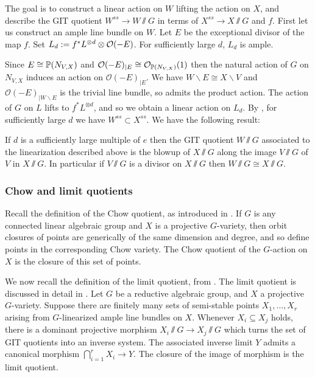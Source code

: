 The goal is to construct a linear action on \(W\) lifting the action on \(X\), and describe the GIT quotient \(W^{ss} \to W \sslash G\) in terms of \(X^{ss} \to  X \sslash G\) and \(f\). First let us construct an ample line bundle on \(W\). Let \(E\) be the exceptional divisor of the map \(f\). Set \(L_d := f^* L^{\otimes d} \otimes \mathcal{O}(-E)\). For sufficiently large \(d\), \(L_d\) is ample.

Since \(E \cong \mathbb{P}(N_{V,X})\) and \(\mathcal{O}(-E)_{|E} \cong \mathcal{O}_{\mathbb{P}(N_{V,X})}(1)\) then the natural action of \(G\) on \(N_{V,X}\) induces an action on \(\mathcal{O}(-E)_{|E}\). We have \(W \backslash E \cong X \backslash V\) and \(\mathcal{O}(-E)_{|W \backslash E}\) is the trivial line bundle, so admits the product action. The action of \(G\) on \(L\) lifts to \(f^* L^{\otimes d} \), and so we obtain a linear action on \(L_d\). By \cite[]{kirwan}, for sufficiently large \(d\) we have \(W^{ss} \subset X^{ss}\). We have the following result:
\begin{lemma}
If \(d\) is a sufficiently large multiple of \(e\) then the GIT quotient \(W \sslash G\) associated to the linearization described above is the blowup of \(X \sslash G\) along the image \(V \sslash G\) of \(V\) in \(X \sslash G\). In particular if \(V \sslash G\) is a divisor on \(X \sslash G\) then \(W \sslash G \cong X \sslash G\).
\end{lemma}
\subsubsection{Chow and limit quotients}
Recall the definition of the Chow quotient, as introduced in \cite{kapranov1993}. If \(G\) is any connected linear algebraic group and \(X\) is a projective \(G\)-variety, then orbit closures of points are generically of the same dimension and degree, and so define points in the corresponding Chow variety. The Chow quotient of the \(G\)-action on \(X\) is the closure of this set of points.

We now recall the definition of the limit quotient, from \cite{mumford1994}. The limit quotient is discussed in detail in \cite{baker2012}. Let \(G\) be a reductive algebraic group, and \(X\) a projective \(G\)-variety. Suppose there are finitely many sets of semi-stable points \(X_1,\dots,X_r\) arising from \(G\)-linearized ample line bundles on \(X\).  Whenever \(X_i \subseteq X_j\) holds, there is a dominant projective morphism \(X_i \sslash G \to X_j \sslash G\) which turns the set of GIT quotients into an inverse system. The associated inverse limit \(Y\) admits a canonical morphism \(\bigcap_{i=1}^r X_i \to Y\). The closure of the image of morphism is the limit quotient.

